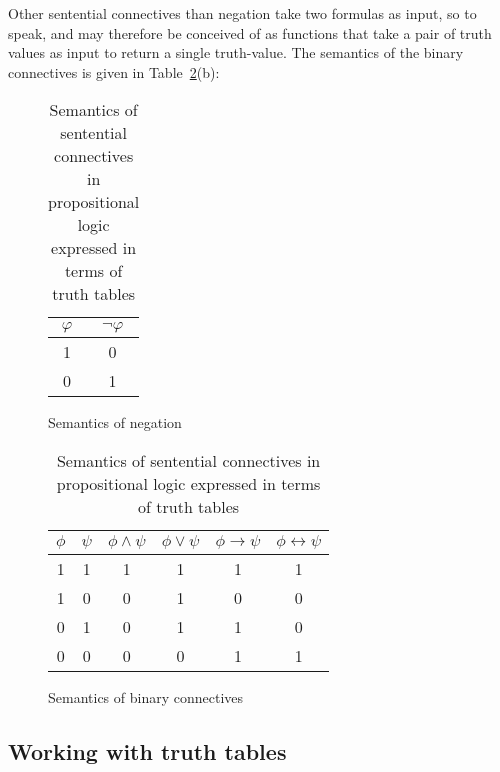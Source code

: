 \documentclass[nobib,nofonts]{tufte-handout}
\begin{document}
Other sentential connectives than negation take two formulas as input, so to speak, and may therefore be conceived of as functions that take a pair of truth values as input to return a single truth-value.
The semantics of the binary connectives is given in Table~\ref{tab:semantics-binary-connectives}(b):

\begin{table}
  \begin{subfigure}[b]{0.3\textwidth}
    \begin{center}
      \begin{tabular}{cc}
        $\varphi$ & $\neg \varphi$ \\ \midrule
        1  & 0\\
        0  & 1
      \end{tabular}
    \end{center}
    \caption{Semantics of negation}
  \end{subfigure}
  \hfill
  \begin{subfigure}[b]{0.75\textwidth}
    \centering
    \begin{tabular}{cccccc}
      $\phi$ & $\psi$ & $\phi \wedge \psi$ & $\phi \vee \psi$ & $\phi \rightarrow \psi$ & $\phi \leftrightarrow \psi$ \\ \midrule
      1  & 1 & 1 & 1 & 1 & 1 \\
      1  & 0 & 0 & 1 & 0 & 0 \\
      0  & 1 & 0 & 1 & 1 & 0 \\
      0  & 0 & 0 & 0 & 1 & 1 \\
    \end{tabular}
    \caption{Semantics of binary connectives}
  \end{subfigure}
  \caption{Semantics of sentential connectives in propositional logic expressed in terms of truth tables}
  \label{tab:semantics-binary-connectives}
\end{table}

\subsection{Working with truth tables}
\end{document}

